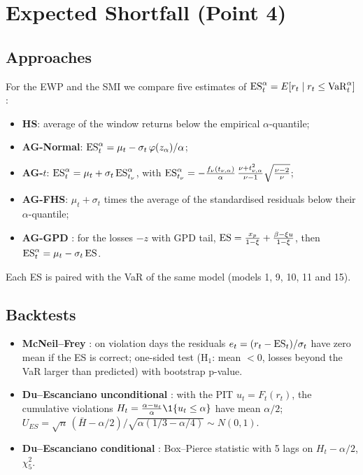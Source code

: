 \section{Expected Shortfall (Point 4)}\label{sec:es}

\subsection{Approaches}
For the EWP and the SMI we compare five estimates of $\mathrm{ES}_t^\alpha = E[r_t \mid r_t \le \mathrm{VaR}_t^\alpha]$:
\begin{itemize}
  \item \textbf{HS}: average of the window returns below the empirical $\alpha$-quantile;
  \item \textbf{AG-Normal}: $\mathrm{ES}_t^\alpha = \mu_t - \sigma_t\,\varphi(z_\alpha)/\alpha$;
  \item \textbf{AG-$t$}: $\mathrm{ES}_t^\alpha = \mu_t + \sigma_t\,\mathrm{ES}^\alpha_{t_\nu}$, with
        $\mathrm{ES}^\alpha_{t_\nu} = -\frac{f_\nu(t_{\nu,\alpha})}{\alpha}\,\frac{\nu+t_{\nu,\alpha}^2}{\nu-1}\sqrt{\frac{\nu-2}{\nu}}$;
  \item \textbf{AG-FHS}: $\mu_t + \sigma_t$ times the average of the standardised residuals below their $\alpha$-quantile;
  \item \textbf{AG-GPD} \citep{mcneil2000}: for the losses $-z$ with GPD tail,
        $\mathrm{ES} = \frac{x_p}{1-\xi} + \frac{\beta-\xi u}{1-\xi}$, then $\mathrm{ES}_t^\alpha = \mu_t - \sigma_t\,\mathrm{ES}$.
\end{itemize}
Each ES is paired with the VaR of the same model (models 1, 9, 10, 11 and 15).

\subsection{Backtests}
\begin{itemize}
  \item \textbf{McNeil--Frey} \citep{mcneil2000}: on violation days the residuals $e_t = (r_t - \mathrm{ES}_t)/\sigma_t$ have
        zero mean if the ES is correct; one-sided test (H$_1$: mean $<0$, losses beyond the VaR larger than predicted)
        with bootstrap p-value.
  \item \textbf{Du--Escanciano unconditional} \citep{du2017}: with the PIT $u_t = F_t(r_t)$, the cumulative violations
        $H_t = \frac{\alpha-u_t}{\alpha}\1\{u_t\le\alpha\}$ have mean $\alpha/2$;
        $U_{ES} = \sqrt n\,(\bar H - \alpha/2)/\sqrt{\alpha(1/3-\alpha/4)} \sim N(0,1)$.
  \item \textbf{Du--Escanciano conditional} \citep{du2017}: Box--Pierce statistic with 5 lags on $H_t-\alpha/2$, $\chi^2_5$.
\end{itemize}

